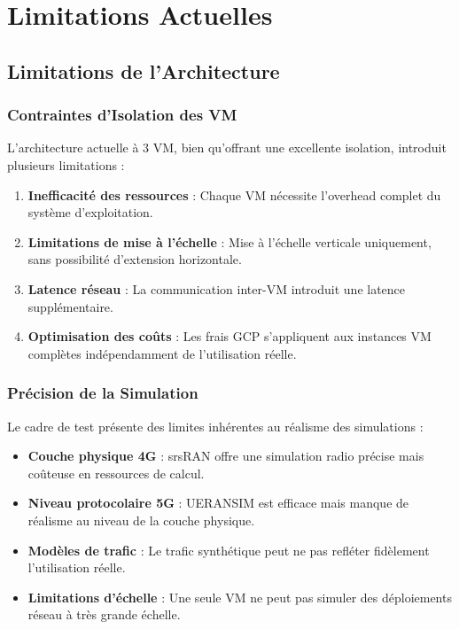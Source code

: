 \documentclass[12pt,a4paper]{report}
\begin{document}
\section{Limitations Actuelles}

\subsection{Limitations de l'Architecture}

\subsubsection{Contraintes d'Isolation des VM}

L'architecture actuelle à 3 VM, bien qu'offrant une excellente isolation, introduit plusieurs limitations :

\begin{enumerate}
    \item \textbf{Inefficacité des ressources} : Chaque VM nécessite l'overhead complet du système d'exploitation.
    \item \textbf{Limitations de mise à l'échelle} : Mise à l'échelle verticale uniquement, sans possibilité d'extension horizontale.
    \item \textbf{Latence réseau} : La communication inter-VM introduit une latence supplémentaire.
    \item \textbf{Optimisation des coûts} : Les frais GCP s'appliquent aux instances VM complètes indépendamment de l'utilisation réelle.
\end{enumerate}

\subsubsection{Précision de la Simulation}

Le cadre de test présente des limites inhérentes au réalisme des simulations :

\begin{itemize}
    \item \textbf{Couche physique 4G} : srsRAN offre une simulation radio précise mais coûteuse en ressources de calcul.
    \item \textbf{Niveau protocolaire 5G} : UERANSIM est efficace mais manque de réalisme au niveau de la couche physique.
    \item \textbf{Modèles de trafic} : Le trafic synthétique peut ne pas refléter fidèlement l'utilisation réelle.
    \item \textbf{Limitations d'échelle} : Une seule VM ne peut pas simuler des déploiements réseau à très grande échelle.
\end{itemize}
\end{document}
